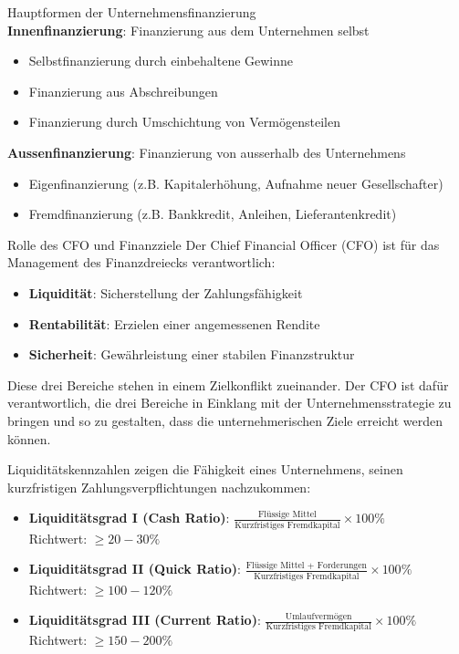 \begin{definition}{Hauptformen der Unternehmensfinanzierung}\\
    \textbf{Innenfinanzierung}: Finanzierung aus dem Unternehmen selbst
    \begin{itemize}
        \item Selbstfinanzierung durch einbehaltene Gewinne
        \item Finanzierung aus Abschreibungen
        \item Finanzierung durch Umschichtung von Vermögensteilen
    \end{itemize}
\textbf{Aussenfinanzierung}: Finanzierung von ausserhalb des Unternehmens
    \begin{itemize}
        \item Eigenfinanzierung (z.B. Kapitalerhöhung, Aufnahme neuer Gesellschafter)
        \item Fremdfinanzierung (z.B. Bankkredit, Anleihen, Lieferantenkredit)
    \end{itemize}
\end{definition}



\begin{concept}{Rolle des CFO und Finanzziele}
Der Chief Financial Officer (CFO) ist für das Management des Finanzdreiecks verantwortlich:
\begin{itemize}
    \item \textbf{Liquidität}: Sicherstellung der Zahlungsfähigkeit
    \item \textbf{Rentabilität}: Erzielen einer angemessenen Rendite
    \item \textbf{Sicherheit}: Gewährleistung einer stabilen Finanzstruktur
\end{itemize}

Diese drei Bereiche stehen in einem Zielkonflikt zueinander. Der CFO ist dafür verantwortlich, die drei Bereiche in Einklang mit der Unternehmensstrategie zu bringen und so zu gestalten, dass die unternehmerischen Ziele erreicht werden können.
\end{concept}

\begin{definition}{Liquiditätskennzahlen}
     zeigen die Fähigkeit eines Unternehmens, seinen kurzfristigen Zahlungsverpflichtungen nachzukommen:
\begin{itemize}
    \item \textbf{Liquiditätsgrad I (Cash Ratio)}: $\frac{\text{Flüssige Mittel}}{\text{Kurzfristiges Fremdkapital}} \times 100\%$ \\Richtwert: $\geq 20-30\%$
    \item \textbf{Liquiditätsgrad II (Quick Ratio)}: $\frac{\text{Flüssige Mittel + Forderungen}}{\text{Kurzfristiges Fremdkapital}} \times 100\%$ \\ Richtwert: $\geq 100-120\%$
    \item \textbf{Liquiditätsgrad III (Current Ratio)}: $\frac{\text{Umlaufvermögen}}{\text{Kurzfristiges Fremdkapital}} \times 100\%$ \\ Richtwert: $\geq 150-200\%$
\end{itemize}
\end{definition}

